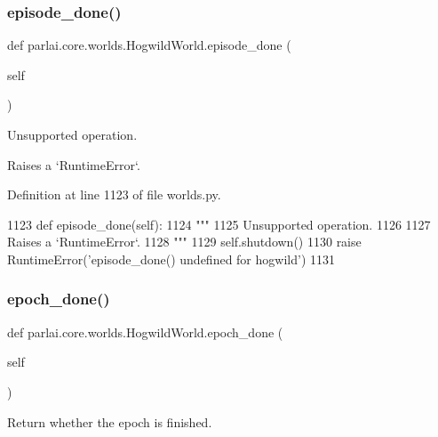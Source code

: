\subsubsection{\texorpdfstring{episode\+\_\+done()}{episode\_done()}}
{\footnotesize\ttfamily def parlai.\+core.\+worlds.\+Hogwild\+World.\+episode\+\_\+done (\begin{DoxyParamCaption}\item[{}]{self }\end{DoxyParamCaption})}

\begin{DoxyVerb}Unsupported operation.

Raises a `RuntimeError`.
\end{DoxyVerb}
 

Definition at line 1123 of file worlds.\+py.


\begin{DoxyCode}
1123     \textcolor{keyword}{def }episode\_done(self):
1124         \textcolor{stringliteral}{"""}
1125 \textcolor{stringliteral}{        Unsupported operation.}
1126 \textcolor{stringliteral}{}
1127 \textcolor{stringliteral}{        Raises a `RuntimeError`.}
1128 \textcolor{stringliteral}{        """}
1129         self.shutdown()
1130         \textcolor{keywordflow}{raise} RuntimeError(\textcolor{stringliteral}{'episode\_done() undefined for hogwild'})
1131 
\end{DoxyCode}
\mbox{\label{classparlai_1_1core_1_1worlds_1_1HogwildWorld_ae80d3f592818ac39b9cf8802270d8d8a}} 
\subsubsection{\texorpdfstring{epoch\+\_\+done()}{epoch\_done()}}
{\footnotesize\ttfamily def parlai.\+core.\+worlds.\+Hogwild\+World.\+epoch\+\_\+done (\begin{DoxyParamCaption}\item[{}]{self }\end{DoxyParamCaption})}

\begin{DoxyVerb}Return whether the epoch is finished.
\end{DoxyVerb}
 

